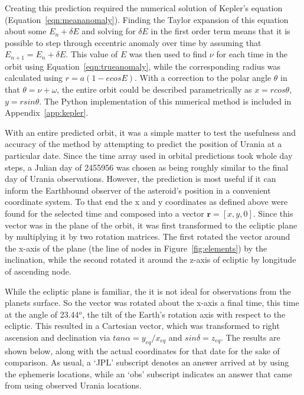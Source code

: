 \documentclass[a4paper,12pt]{article}
\begin{document}
Creating this prediction required the numerical solution of Kepler's equation (Equation~\ref{eqn:meananomaly}). Finding the Taylor expansion of this equation about some $E_n+\delta E$ and solving for $\delta E$ in the first order term means that it is possible to step through eccentric anomaly over time by assuming that $E_{n+1} = E_n + \delta E$. This value of $E$ was then used to find $\nu$ for each time in the orbit using Equation~\ref{eqn:trueanomaly}, while the corresponding radius was calculated using $r = a(1-ecosE)$. With a correction to the polar angle $\theta$ in that $\theta = \nu + \omega$, the entire orbit could be described parametrically as $x = rcos\theta$, $y = rsin\theta$. The Python implementation of this numerical method is included in Appendix~\ref{app:kepler}.

With an entire predicted orbit, it was a simple matter to test the usefulness and accuracy of the method by attempting to predict the position of Urania at a particular date. Since the time array used in orbital predictions took whole day steps, a Julian day of 2455956 was chosen as being roughly similar to the final day of Urania observations. However, the prediction is most useful if it can inform the Earthbound observer of the asteroid's position in a convenient coordinate system. To that end the x and y coordinates as defined above were found for the selected time and composed into a vector $\mathbf{r} = [x,y,0]$. Since this vector was in the plane of the orbit, it was first transformed to the ecliptic plane by multiplying it by two rotation matrices. The first rotated the vector around the x-axis of the plane (the line of nodes in Figure~\ref{fig:elements}) by the inclination, while the second rotated it around the z-axis of ecliptic by longitude of ascending node.

While the ecliptic plane is familiar, the it is not ideal for observations from the planets surface. So the vector was rotated about the x-axis a final time, this time at the angle of 23.44$^o$, the tilt of the Earth's rotation axis with respect to the ecliptic. This resulted in a Cartesian vector, which was transformed to right ascension and declination via $tan\alpha = y_{eq}/x_{eq}$ and $sin\delta = z_{eq}$.
The results are shown below, along with the actual coordinates for that date for the sake of comparison. As usual, a `JPL' subscript denotes an answer arrived at by using the ephemeris locations, while an `obs' subscript indicates an answer that came from using observed Urania locations.
\end{document}
